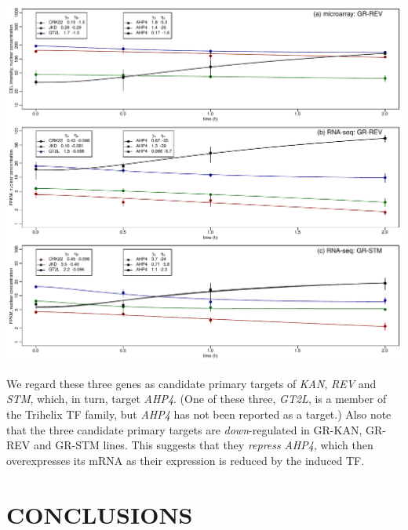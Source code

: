 \documentclass[aspb,landscape]{a0poster}
\newlength{\figwidth}
\newlength{\figtopspace}
\begin{document}
\begin{multicols}{3}
  \begin{center}\vspace{\figtopspace}
    \includegraphics[width=\figwidth]{AHP4}
  \end{center}

  We regard these three genes as candidate primary targets of \textit{KAN}, \textit{REV} and \textit{STM}, which, in turn, target \textit{AHP4}.
  (One of these three, \textit{GT2L}, is a member of the Trihelix TF family, but \textit{AHP4} has not been reported as a target.)
  Also note that the three candidate primary targets are \textit{down}-regulated in GR-KAN, GR-REV and GR-STM lines.
  This suggests that they \textit{repress} \textit{AHP4}, which then overexpresses its mRNA as their expression is reduced by the induced TF.
  

  \section*{CONCLUSIONS}
  \color{CarnegiePriBlue}


\end{multicols}
\end{document}
